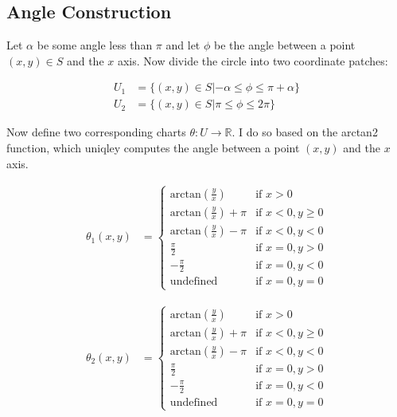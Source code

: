 \documentclass{article}
\begin{document}
    \subsection{Angle Construction}

        Let $\alpha$ be some angle less than $\pi$ and let $\phi$ be the angle between a point $(x,y) \in S$ and the $x$ axis. Now divide the circle into two coordinate patches:

        \begin{align*}
            U_1 &= \{(x,y) \in S | - \alpha \leq \phi \leq \pi + \alpha \} \\
            U_2 &= \{(x,y) \in S | \pi \leq \phi \leq 2\pi \}
        \end{align*}

        Now define two corresponding charts $\theta: U \rightarrow \mathbb{R}$. I do so based on the arctan2 function, which uniqley computes the angle between a point $(x,y)$ and the $x$ axis. 

        \begin{align*}
            \theta_1(x,y) &= 
            \begin{cases}
                \textrm{arctan}(\frac{y}{x}) & \textrm{if } x > 0 \\
                \textrm{arctan}(\frac{y}{x}) + \pi & \textrm{if } x < 0, y \geq 0 \\
                \textrm{arctan}(\frac{y}{x}) - \pi & \textrm{if } x < 0, y < 0 \\
                \frac{\pi}{2} & \textrm{if } x = 0, y > 0 \\
                -\frac{\pi}{2} & \textrm{if } x = 0, y < 0 \\
                \textrm{undefined} & \textrm{if } x = 0, y = 0
            \end{cases}
        \end{align*}

        \begin{align*}
            \theta_2(x,y) &= 
            \begin{cases}
                \textrm{arctan}(\frac{y}{x}) & \textrm{if } x > 0 \\
                \textrm{arctan}(\frac{y}{x}) + \pi & \textrm{if } x < 0, y \geq 0 \\
                \textrm{arctan}(\frac{y}{x}) - \pi & \textrm{if } x < 0, y < 0 \\
                \frac{\pi}{2} & \textrm{if } x = 0, y > 0 \\
                -\frac{\pi}{2} & \textrm{if } x = 0, y < 0 \\
                \textrm{undefined} & \textrm{if } x = 0, y = 0
            \end{cases}
        \end{align*}
\end{document}
